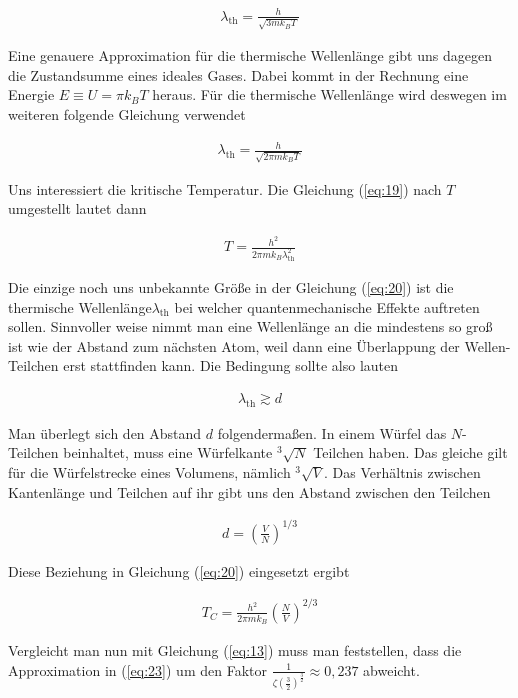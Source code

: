 \begin{align}
  \label{eq:18}
  \lambda_{\text{th}} = \frac{h}{\sqrt{3mk_B T}}
\end{align}

Eine genauere Approximation für die thermische Wellenlänge gibt uns dagegen die Zustandsumme eines ideales Gases. Dabei kommt in der Rechnung eine Energie \(E\equiv U=\pi k_B T \) heraus. Für die thermische Wellenlänge wird deswegen im weiteren folgende Gleichung verwendet

\begin{align}
  \label{eq:19}
  \lambda_{\text{th}} = \frac{h}{\sqrt{2\pi mk_B T}}
\end{align}

Uns interessiert die kritische Temperatur. Die Gleichung (\ref{eq:19}) nach \(T\) umgestellt lautet dann

\begin{align}
  \label{eq:20}
  T = \frac{h^2}{2\pi mk_B \lambda^2_{\text{th}}}
\end{align}

Die einzige noch uns unbekannte Größe in der Gleichung (\ref{eq:20}) ist die thermische Wellenlänge\(\lambda_{\text{th}}\) bei welcher quantenmechanische Effekte auftreten sollen. Sinnvoller weise nimmt man eine Wellenlänge an die mindestens so groß ist wie der Abstand zum nächsten Atom, weil dann eine Überlappung der Wellen-Teilchen erst stattfinden kann. Die Bedingung sollte also lauten

\begin{align}
  \label{eq:21}
  \lambda_{\text{th}} \gtrsim d
\end{align}

Man überlegt sich den Abstand \(d\) folgendermaßen. In einem Würfel das \(N\)-Teilchen beinhaltet, muss eine Würfelkante \(^3\sqrt{N}\) Teilchen haben. Das gleiche gilt für die Würfelstrecke eines Volumens, nämlich \(^3\sqrt{V}\). Das Verhältnis zwischen Kantenlänge und Teilchen auf ihr gibt uns den Abstand zwischen den Teilchen

\begin{align}
  \label{eq:22}
  d = \left( \frac{V}{N}\right)^{1/3}
\end{align}

Diese Beziehung in Gleichung (\ref{eq:20}) eingesetzt ergibt 

\begin{align}
  \label{eq:23}
  T_C = \frac{h^2}{2\pi mk_B} \left( \frac{N}{V}\right)^{2/3}
\end{align}

Vergleicht man nun mit Gleichung (\ref{eq:13}) muss man feststellen, dass die Approximation in (\ref{eq:23}) um den Faktor \(\frac{1}{\zeta(\frac{3}{2})^{\frac{3}{2}}}\approx 0,237 \) abweicht.




